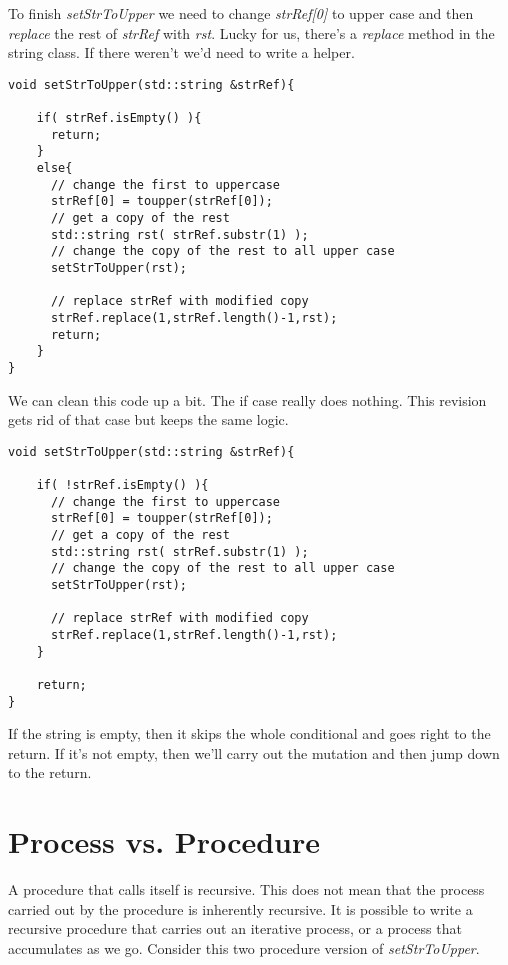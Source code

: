 \documentclass[]{tufte-handout}
\begin{document}
To finish \textit{setStrToUpper} we need to change \textit{strRef[0]} to upper case and then \textit{replace} the rest of \textit{strRef} with \textit{rst}.  Lucky for us, there's a \textit{replace} method in the string class. If there weren't we'd need to write a helper.

\begin{verbatim}
void setStrToUpper(std::string &strRef){
 	
 	if( strRef.isEmpty() ){
 	  return;
 	}
 	else{
      // change the first to uppercase
 	  strRef[0] = toupper(strRef[0]);
 	  // get a copy of the rest
	  std::string rst( strRef.substr(1) );  	  
      // change the copy of the rest to all upper case
 	  setStrToUpper(rst);
 	  
 	  // replace strRef with modified copy
 	  strRef.replace(1,strRef.length()-1,rst);
 	  return; 
 	}
}
\end{verbatim} 

We can clean this code up a bit. The if case really does nothing.  This revision gets rid of that case but keeps the same logic.
\begin{verbatim}
void setStrToUpper(std::string &strRef){
 	
 	if( !strRef.isEmpty() ){
 	  // change the first to uppercase
 	  strRef[0] = toupper(strRef[0]);
 	  // get a copy of the rest
	  std::string rst( strRef.substr(1) );  	  
      // change the copy of the rest to all upper case
 	  setStrToUpper(rst);
 	  
 	  // replace strRef with modified copy
 	  strRef.replace(1,strRef.length()-1,rst); 	  
 	}
 	
 	return;
}
\end{verbatim}

If the string is empty, then it skips the whole conditional and goes right to the return. If it's not empty, then we'll carry out the mutation and then jump down to the return. 

\section{Process vs. Procedure}

A procedure that calls itself is recursive.  This does not mean that the process carried out by the procedure is inherently recursive.  It is possible to write a recursive procedure that carries out an iterative process, or a process that accumulates as we go.  Consider this two procedure version of \textit{setStrToUpper}.
\end{document}

